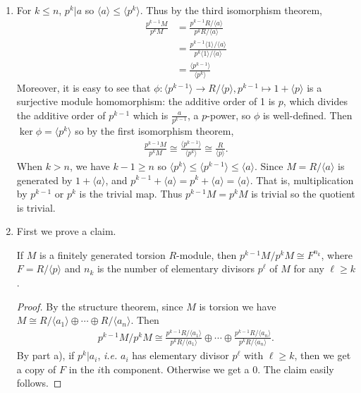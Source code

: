 \documentclass[12pt]{article}
\begin{document}
\begin{problem}[7]
~\begin{enumerate}[label=(\alph*)]
	\item For $ k \leq n$,  $ p ^{k} | a$ so $ \langle a \rangle \leq \langle p ^{k} \rangle$. Thus by the third isomorphism theorem,
		\begin{align*}
			\frac{p ^{k-1}M}{p ^{k}M } &= \frac{ p ^{k-1} R / \langle a \rangle}{p ^{k} R /\langle a \rangle } \\
			&= \frac{p ^{k-1} \langle 1 \rangle / \langle a \rangle}{ p ^{k} \langle 1 \rangle / \langle a \rangle} \\
			&= \frac{\langle p ^{k-1} \rangle}{ \langle p ^{k}  \rangle}
		\end{align*}
Moreover, it is easy to see that $ \phi: \langle p ^{k-1} \rangle \to R / \langle p \rangle, p ^{k-1} \mapsto 1+ \langle p \rangle  $ is a surjective module homomorphism: the additive order of 1 is $ p$, which divides the additive order of $ p ^{k-1}$ which is  $ \frac{a}{p ^{k-1}}$, a $ p$-power, so $ \phi$ is well-defined. Then $ \ker \phi = \langle p ^{k} \rangle$ so by the first isomorphism theorem,
 \begin{align*}
	\frac{p ^{k-1}M}{ p ^{k} M } \cong \frac{\langle p ^{k-1} \rangle}{ \langle p ^{k} \rangle} \cong \frac{R}{ \langle p \rangle}.
\end{align*}
When $ k>n$, we have $ k-1 \geq n$ so $ \langle p ^{k} \rangle \leq \langle p ^{k-1} \rangle \leq \langle a \rangle$. Since $ M= R / \langle a \rangle$ is generated by  $ 1+ \langle a \rangle$, and $ p ^{k-1}+ \langle a \rangle = p ^{k} + \langle a \rangle = \langle a \rangle$. That is, multiplication by $ p ^{k-1}$ or $ p ^{k}$ is the trivial map. Thus $ p ^{k-1} M = p ^{k} M$ is trivial so the quotient is trivial.
\item First we prove a claim.
\begin{claim}
If $ M $ is a finitely generated torsion  $ R$-module, then  $ p ^{k-1}M / p ^{k} M \cong F^{n_k}$, where $ F = R / \langle p \rangle$ and $ n_k$ is the number of elementary divisors $ p ^{ \ell}$ of $ M$ for any $ \ell \geq k$.
\end{claim}
\begin{proof}
By the structure theorem, since $ M$ is torsion we have $ M \cong R / \langle a_1 \rangle \oplus \cdots \oplus R / \langle a_n \rangle$. Then
\begin{align*}
	p ^{k-1}M / p ^{k} M \cong \frac{p ^{k-1} R /\langle a_1 \rangle}{p ^{k} R /\langle a_1 \rangle} \oplus \cdots \oplus \frac{p ^{k-1}R/\langle a_n \rangle}{p ^{k}R / \langle a_n \rangle }.
\end{align*}
By part a), if $ p ^{k} | a_i$, \emph{i.e.} $ a_i$ has elementary divisor $ p ^{ \ell}$ with $ \ell \geq k$, then we get a copy of $ F$ in the  $ i$th component. Otherwise we get a 0. The claim easily follows.
\end{proof}


\end{enumerate}
\end{problem}
\end{document}
